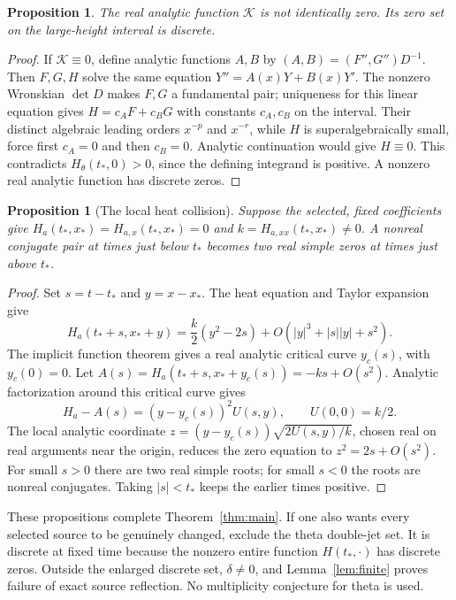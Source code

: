 \documentclass[11pt]{article}
\newtheorem{proposition}[theorem]{Proposition}
\theoremstyle{remark}\newtheorem{remark}[theorem]{Remark}
\newcommand{\thetaH}{H_\theta}
\begin{document}
\begin{proposition}\label{prop:nondegenerate}
The real analytic function $\mathcal K$ is not identically zero. Its zero set on the large-height interval is discrete.
\end{proposition}
\begin{proof}
If $\mathcal K\equiv0$, define analytic functions $A,B$ by
$(A,B)=(F'',G'')D^{-1}$. Then $F,G,H$ solve the same equation
$Y''=A(x)Y+B(x)Y'$. The nonzero Wronskian $\det D$ makes $F,G$ a fundamental pair; uniqueness for this linear equation gives $H=c_AF+c_BG$ with constants $c_A,c_B$ on the interval. Their distinct algebraic leading orders $x^{-p}$ and $x^{-r}$, while $H$ is superalgebraically small, force first $c_A=0$ and then $c_B=0$. Analytic continuation would give $H\equiv0$. This contradicts $\thetaH(t_*,0)>0$, since the defining integrand is positive. A nonzero real analytic function has discrete zeros.
\end{proof}

\begin{proposition}[The local heat collision]\label{prop:heat}
Suppose the selected, fixed coefficients give $H_a(t_*,x_*)=H_{a,x}(t_*,x_*)=0$ and $k=H_{a,xx}(t_*,x_*)\ne0$. A nonreal conjugate pair at times just below $t_*$ becomes two real simple zeros at times just above $t_*$.
\end{proposition}
\begin{proof}
Set $s=t-t_*$ and $y=x-x_*$. The heat equation and Taylor expansion give
\[
 H_a(t_*+s,x_*+y)=\frac{k}{2}(y^2-2s)
 +O(|y|^3+|s||y|+s^2).
\]
The implicit function theorem gives a real analytic critical curve $y_c(s)$, with $y_c(0)=0$. Let $A(s)=H_a(t_*+s,x_*+y_c(s))=-ks+O(s^2)$. Analytic factorization around this critical curve gives
\[
 H_a-A(s)=(y-y_c(s))^2 U(s,y),\qquad U(0,0)=k/2.
\]
The local analytic coordinate $z=(y-y_c(s))\sqrt{2U(s,y)/k}$, chosen real on real arguments near the origin, reduces the zero equation to $z^2=2s+O(s^2)$. For small $s>0$ there are two real simple roots; for small $s<0$ the roots are nonreal conjugates. Taking $|s|<t_*$ keeps the earlier times positive.
\end{proof}

These propositions complete Theorem~\ref{thm:main}. If one also wants every selected source to be genuinely changed, exclude the theta double-jet set. It is discrete at fixed time because the nonzero entire function $H(t_*,\cdot)$ has discrete zeros. Outside the enlarged discrete set, $\delta\ne0$, and Lemma~\ref{lem:finite} proves failure of exact source reflection. No multiplicity conjecture for theta is used.
\end{document}
